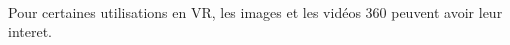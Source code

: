 \paragraph{}

Pour certaines utilisations en VR, les images et les vidéos 360 peuvent avoir leur interet. 